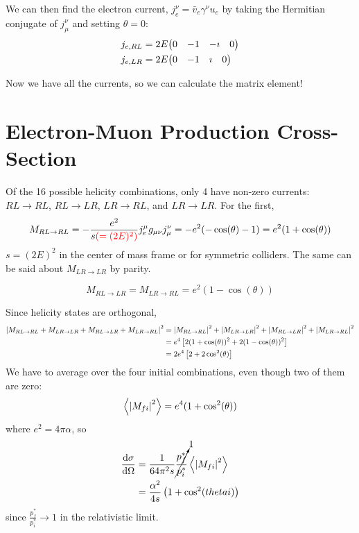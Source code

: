 \documentclass[a4paper,twoside,master.tex]{subfiles}
\begin{document}
We can then find the electron current, $ j_e^{\nu} = \bar{v}_e \gamma^{\nu} u_e $ by taking the Hermitian conjugate of $ j_{\mu}^{\nu} $ and setting $ \theta = 0 $:
\begin{align}
    j_{e,RL} &= 2E \mqty(0 & -1 & - \imath & 0)\\
    j_{e,LR} &= 2E \mqty(0 & -1 & \imath & 0)
\end{align}

Now we have all the currents, so we can calculate the matrix element!


\section{Electron-Muon Production Cross-Section}\label{sec:electron-muon_production_cross-section}

Of the 16 possible helicity combinations, only 4 have non-zero currents: $ RL \to RL $, $ RL \to LR $, $ LR \to RL $, and $ LR \to LR $. For the first,
\begin{equation}
    M_{RL \to RL} = - \frac{e^2}{s \color{red}(=(2E)^2)\color{black}} j_{e}^{\mu} g_{\mu \nu} j_{\mu}^{\nu} = - e^2 (- \cos(\theta) - 1) = e^2 (1 + \cos(\theta))
\end{equation}
$ s = (2E)^2 $ in the center of mass frame or for symmetric colliders.
The same can be said about $ M_{LR \to LR} $ by parity.

\begin{equation}
    M_{RL \to LR} = M_{LR \to RL} = e^2 (1 - \cos(\theta))
\end{equation}

Since helicity states are orthogonal,
\begin{align}
    \abs{M_{RL \to RL} + M_{LR \to LR} + M_{RL \to LR} + M_{LR \to RL}}^2 &= \abs{M_{RL \to RL}}^2 + \abs{M_{LR \to LR}}^2 + \abs{M_{RL \to LR}}^2 + \abs{M_{LR \to RL}}^2 \\
                       &= e^4 \left[ 2(1 + \cos(\theta))^2 + 2(1 - \cos(\theta))^2 \right] \\
                       &= 2 e^4 \left[ 2 + 2 \cos[2](\theta) \right]
\end{align}
We have to average over the four initial combinations, even though two of them are zero:
\begin{equation}
    \ev{\abs{M_{fi}}^2} = e^4 (1 + \cos[2](\theta))
\end{equation}
where $ e^2 = 4 \pi \alpha $, so
\begin{align}
    \dv{\sigma}{\Omega} &= \frac{1}{64 \pi^2 s} \cancelto{1}{\frac{p_f^*}{p_i^*}} \ev{\abs{M_{fi}}^2} \\
                        &= \frac{\alpha^2}{4 s} \left( 1 + \cos[2](thetai) \right)
\end{align}
since $ \frac{p_f^*}{p_i^*} \to 1 $ in the relativistic limit.
\end{document}
